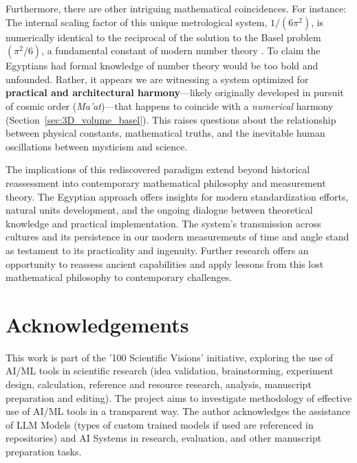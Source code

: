 \documentclass[11pt]{article}
\begin{document}
Furthermore, there are other intriguing mathematical coincidences. For instance: The internal scaling factor of this unique metrological system, $1/(6\pi^2)$, is numerically identical to the reciprocal of the solution to the Basel problem $(\pi^2/6)$, a fundamental constant of modern number theory \cite{dunham1999euler}. To claim the Egyptians had formal knowledge of number theory would be too bold and unfounded. Rather, it appears we are witnessing a system optimized for \textbf{practical and architectural harmony}---likely originally developed in pursuit of cosmic order (\textit{Ma'at})---that happens to coincide with a \textit{numerical} harmony (Section~\ref{sec:3D_volume_basel}). This raises questions about the relationship between physical constants, mathematical truths, and the inevitable human oscillations between mysticism and science.

The implications of this rediscovered paradigm extend beyond historical reassessment into contemporary mathematical philosophy and measurement theory. The Egyptian approach offers insights for modern standardization efforts, natural units development, and the ongoing dialogue between theoretical knowledge and practical implementation. The system's transmission across cultures and its persistence in our modern measurements of time and angle stand as testament to its practicality and ingenuity. Further research offers an opportunity to reassess ancient capabilities and apply lessons from this lost mathematical philosophy to contemporary challenges.


\section*{Acknowledgements}
\label{sec:acknowledgements} %

This work is part of the '100 Scientific Visions' initiative, exploring the use of AI/ML tools in scientific research (idea validation, brainstorming, experiment design, calculation, reference and resource research, analysis, manuscript preparation and editing). The project aims to investigate methodology of effective use of AI/ML tools in a transparent way. The author acknowledges the assistance of LLM Models (types of custom trained models if used are referenced in repositories) and AI Systems in research, evaluation, and other manuscript preparation tasks.
\end{document}
